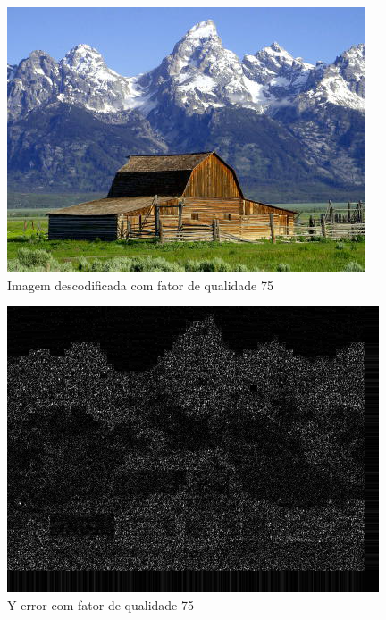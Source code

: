 \documentclass[a4paper, 12pt]{article}
\begin{document}
        \pagebreak
        \begin{multicols}{2}
            \begin{figure}[H]
                \includegraphics[width=\linewidth]{resources/DIFFS/Descodification_quality_75.png}
                \caption{\label{fig:my_label} Imagem descodificada com fator de qualidade 75}
            \end{figure}
            \begin{figure}[H]
                \includegraphics[width=\linewidth]{resources/DIFFS/Diff_Image_with_quality_75.png}
                \caption{\label{fig:my_label} Y error com fator de qualidade 75}
            \end{figure}
        \end{multicols}
\end{document}
